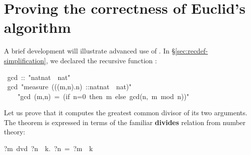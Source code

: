 \section{Proving the correctness of Euclid's algorithm}
\label{sec:proving-euclid}

A brief development will illustrate advanced use of  
.  In \S\ref{sec:recdef-simplification}, we declared the
recursive function {}:
\begin{isabelle}
\ gcd\ ::\ "nat{\isacharasterisk}nat\ \isasymRightarrow\ nat"\
\
\
\ \ \ \ \ \ \ \ \ \ \ \ \isanewline
{}\ gcd\ "measure\ ((\isasymlambda(m,n).n)\
::nat{\isacharasterisk}nat\ \isasymRightarrow\ nat)"\isanewline
\ \ \ \ "gcd\ (m,n)\ =\ (if\ n=0\ then\ m\ else\ gcd(n,\ m\ mod\ n))"
\end{isabelle}
Let us prove that it computes the greatest common
divisor of its two arguments.  
%
%
%
The theorem is expressed in terms of the familiar
\textbf{divides} relation from number theory: 
\begin{isabelle}
?m\ dvd\ ?n\ \isasymequiv\ {\isasymexists}k.\ ?n\ =\ ?m\ \isacharasterisk\ k
\rulename{dvd_def}
\end{isabelle}

